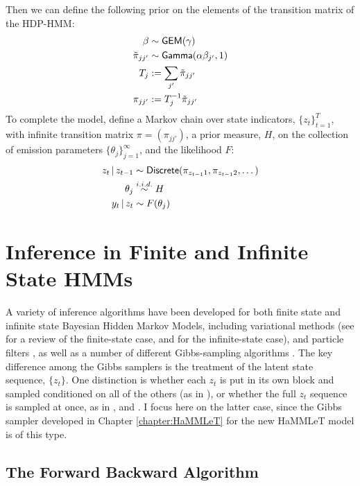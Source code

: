 Then we can define the following prior on the elements of the transition matrix of the
HDP-HMM:
\begin{align}
  \beta &\sim \mathsf{GEM}(\gamma) \\
  \tilde{\pi}_{jj'} &\sim \mathsf{Gamma}(\alpha \beta_{j'},1) \\
  T_j &:= \sum_{j'} \tilde{\pi}_{jj'} \\
  \pi_{jj'} &:= T_j^{-1} \tilde{\pi}_{jj'} 
\end{align}
To complete the model, define a Markov chain over state indicators,
$\{z_t\}_{t=1}^T$, with infinite transition matrix $\pi =
(\pi_{jj'})$, a prior measure, $H$, on the collection of emission parameters
$\{\theta_j\}_{j=1}^\infty$, and the likelihood $F$:
\begin{align}
  z_t \, \vert \, z_{t-1} &\sim \mathsf{Discrete}(\pi_{z_{t-1}1},\pi_{z_{t-1}2},
    \dots) \\
  \theta_j &\stackrel{i.i.d.}{\sim} H \\
  y_t \, \vert \, z_t &\sim F(\theta_j)
\end{align}

\section{Inference in Finite and Infinite State HMMs}
\label{sec:inference-hdp-hmm}

A variety of inference algorithms have been developed for both finite
state and infinite state Bayesian Hidden
Markov Models, including variational methods (see \cite{beal2003variational} for
a review of the finite-state case, and \cite{johnson2014stochastic}
for the infinite-state case), and particle filters 
\citep{fearnhead2003line, tripuraneni2015particle}, as well as a number
of different Gibbs-sampling algorithms \citep{teh2006hierarchical,
  vangael2008beam, fox2008hdp, johnson2013bayesian}.  
The key difference among the Gibbs samplers is
the treatment of the latent state sequence, $\{z_t\}$.  One
distinction is whether each $z_t$ is put in its own block and sampled conditioned on
all of the others (as in \citeauthor{teh2006hierarchical}), or whether
the full $z_t$ sequence is sampled at once, as in
\citeauthor{vangael2008beam}, \citeauthor{fox2008hdp} and
\citeauthor{johnson2013bayesian}.  I focus here on the latter case,
since the Gibbs sampler developed in Chapter \ref{chapter:HaMMLeT} for
the new HaMMLeT model is of this type.

\subsection{The Forward Backward Algorithm}
\label{sec:forw-backw-algor-1}

